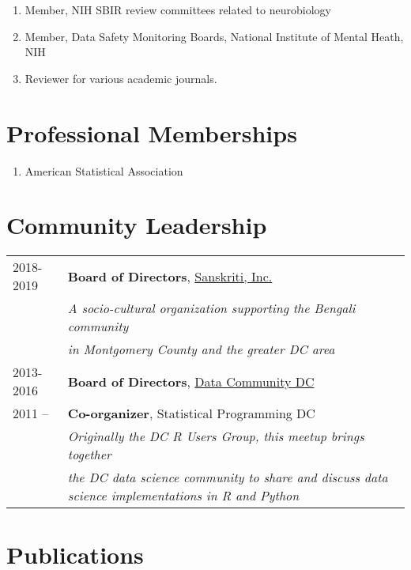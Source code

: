 \documentclass[11pt, a4paper]{awesome-cv}
\providecommand{\tightlist}{%
	\setlength{\itemsep}{0pt}\setlength{\parskip}{0pt}}
\begin{document}
\begin{enumerate}
\def\labelenumi{\arabic{enumi}.}
\tightlist
\item
  Member, NIH SBIR review committees related to neurobiology
\item
  Member, Data Safety Monitoring Boards, National Institute of Mental Heath, NIH
\item
  Reviewer for various academic journals.
\end{enumerate}

\hypertarget{professional-memberships}{%
\section{Professional Memberships}\label{professional-memberships}}

\begin{enumerate}
\def\labelenumi{\arabic{enumi}.}
\tightlist
\item
  American Statistical Association
\end{enumerate}

\hypertarget{community-leadership}{%
\section{Community Leadership}\label{community-leadership}}

\begin{tabular}{ll}
  2018-2019 & \textbf{Board of Directors}, \href{http://www.sanskriti-dc.org}{Sanskriti, Inc.} \\ 
   & \emph{A socio-cultural organization supporting the Bengali community} \\ 
   & \emph{in Montgomery County and the greater DC area} \\ 
  2013-2016 & \textbf{Board of Directors}, \href{https://www.datacommunitydc.org}{Data Community DC} \\ 
  2011 -- & \textbf{Co-organizer}, Statistical Programming DC \\ 
   & \emph{Originally the DC R Users Group, this meetup brings together} \\ 
   & \emph{the DC data science community to share and discuss data science implementations in R and Python} \\ 
  \end{tabular}

\newpage

\hypertarget{publications}{%
\section{Publications}\label{publications}}
\end{document}
